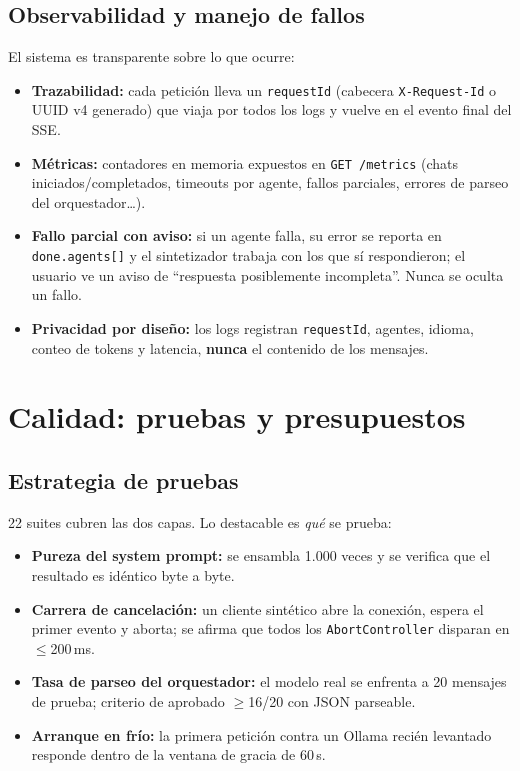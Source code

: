 \documentclass[11pt,a4paper]{article}
\newcommand{\code}[1]{\texttt{\small #1}}
\begin{document}
\subsection{Observabilidad y manejo de fallos}

El sistema es transparente sobre lo que ocurre:

\begin{itemize}
\item \textbf{Trazabilidad:} cada petición lleva un \code{requestId} (cabecera
\code{X-Request-Id} o UUID v4 generado) que viaja por todos los logs y vuelve
en el evento final del SSE.
\item \textbf{Métricas:} contadores en memoria expuestos en \code{GET /metrics}
(chats iniciados/completados, timeouts por agente, fallos parciales, errores de
parseo del orquestador\dots).
\item \textbf{Fallo parcial con aviso:} si un agente falla, su error se reporta
en \code{done.agents[]} y el sintetizador trabaja con los que sí respondieron;
el usuario ve un aviso de ``respuesta posiblemente incompleta''. Nunca se oculta
un fallo.
\item \textbf{Privacidad por diseño:} los logs registran \code{requestId},
agentes, idioma, conteo de tokens y latencia, \textbf{nunca} el contenido de
los mensajes.
\end{itemize}

\section{Calidad: pruebas y presupuestos}

\subsection{Estrategia de pruebas}

22 suites cubren las dos capas. Lo destacable es \emph{qué} se prueba:

\begin{itemize}
\item \textbf{Pureza del system prompt:} se ensambla 1.000 veces y se verifica
que el resultado es idéntico byte a byte.
\item \textbf{Carrera de cancelación:} un cliente sintético abre la conexión,
espera el primer evento y aborta; se afirma que todos los \code{AbortController}
disparan en $\leq$200\,ms.
\item \textbf{Tasa de parseo del orquestador:} el modelo real se enfrenta a 20
mensajes de prueba; criterio de aprobado $\geq$16/20 con JSON parseable.
\item \textbf{Arranque en frío:} la primera petición contra un Ollama recién
levantado responde dentro de la ventana de gracia de 60\,s.
\end{itemize}
\end{document}
